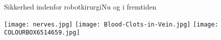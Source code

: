\begin{frame}{Sikkerhed indenfor robotkirurgi}{Nu og i fremtiden}
\begin{minipage}{0.35\textwidth}
	\vspace{-60mm}
\texttt{[image: nerves.jpg]}
\vspace{2mm}
\texttt{[image: Blood-Clots-in-Vein.jpg]}
\vspace{2mm}
\texttt{[image: COLOURBOX6514659.jpg]}
\end{minipage}

\end{frame}

